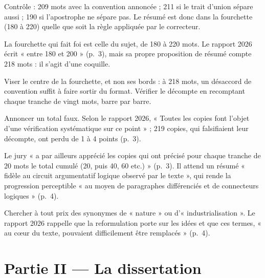 \documentclass[11pt,a4paper]{article}
\begin{document}
Contrôle : 209 mots avec la convention annoncée ; 211 si le trait d'union sépare aussi ; 190 si l'apostrophe ne sépare pas. Le résumé est donc dans la fourchette (180 à 220) quelle que soit la règle appliquée par le correcteur.

La fourchette qui fait foi est celle du sujet, de 180 à 220 mots. Le rapport 2026 écrit « entre 180 et 200 » (p.~3), mais sa propre proposition de résumé compte 218 mots : il s'agit d'une coquille.

\begin{methode}

Viser le centre de la fourchette, et non ses bords : à 218 mots, un désaccord de convention suffit à faire sortir du format. Vérifier le décompte en recomptant chaque tranche de vingt mots, barre par barre.

\end{methode}

\begin{piege}

Annoncer un total faux. Selon le rapport 2026, « Toutes les copies font l'objet d'une vérification systématique sur ce point » ; 219 copies, qui falsifiaient leur décompte, ont perdu de 1 à 4 points (p.~3).

\end{piege}

\begin{jury}

Le jury « a par ailleurs apprécié les copies qui ont précisé pour chaque tranche de 20 mots le total cumulé (20, puis 40, 60 etc.) » (p.~3). Il attend un résumé « fidèle au circuit argumentatif logique observé par le texte », qui rende la progression perceptible « au moyen de paragraphes différenciés et de connecteurs logiques » (p.~4).

\end{jury}

\begin{piege}

Chercher à tout prix des synonymes de « nature » ou d'« industrialisation ». Le rapport 2026 rappelle que la reformulation porte sur les idées et que ces termes, « au cœur du texte, pouvaient difficilement être remplacés » (p.~4).

\end{piege}

\hypertarget{partie-ii-la-dissertation}{%
\section{Partie II --- La dissertation}\label{partie-ii-la-dissertation}}
\end{document}
